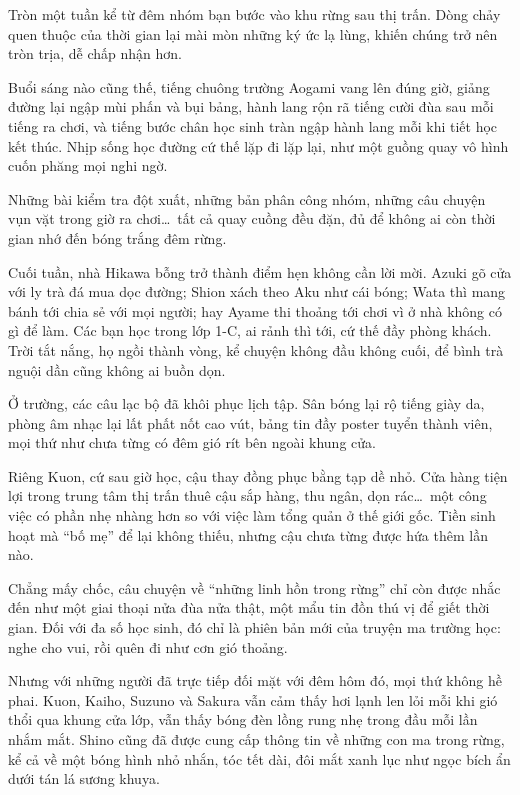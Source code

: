 \documentclass[../main.tex]{subfiles}
\begin{document}
Tròn một tuần kể từ đêm nhóm bạn bước vào khu rừng sau thị trấn. Dòng chảy quen thuộc của thời gian lại mài mòn những ký ức lạ lùng, khiến chúng trở nên tròn trịa, dễ chấp nhận hơn.

Buổi sáng nào cũng thế, tiếng chuông trường Aogami vang lên đúng giờ, giảng đường lại ngập mùi phấn và bụi bảng, hành lang rộn rã tiếng cười đùa sau mỗi tiếng ra chơi, và tiếng bước chân học sinh tràn ngập hành lang mỗi khi tiết học kết thúc. Nhịp sống học đường cứ thế lặp đi lặp lại, như một guồng quay vô hình cuốn phăng mọi nghi ngờ.

Những bài kiểm tra đột xuất, những bản phân công nhóm, những câu chuyện vụn vặt trong giờ ra chơi\dots\ tất cả quay cuồng đều đặn, đủ để không ai còn thời gian nhớ đến bóng trắng đêm rừng.

Cuối tuần, nhà Hikawa bỗng trở thành điểm hẹn không cần lời mời. Azuki gõ cửa với ly trà đá mua dọc đường; Shion xách theo Aku như cái bóng; Wata thì mang bánh tới chia sẻ với mọi người; hay Ayame thi thoảng tới chơi vì ở nhà không có gì để làm. Các bạn học trong lớp 1-C, ai rảnh thì tới, cứ thế đầy phòng khách. Trời tắt nắng, họ ngồi thành vòng, kể chuyện không đầu không cuối, để bình trà nguội dần cũng không ai buồn dọn.

Ở trường, các câu lạc bộ đã khôi phục lịch tập. Sân bóng lại rộ tiếng giày da, phòng âm nhạc lại lất phất nốt cao vút, bảng tin đầy poster tuyển thành viên, mọi thứ như chưa từng có đêm gió rít bên ngoài khung cửa.

Riêng Kuon, cứ sau giờ học, cậu thay đồng phục bằng tạp dề nhỏ. Cửa hàng tiện lợi trong trung tâm thị trấn thuê cậu sắp hàng, thu ngân, dọn rác\dots\ một công việc có phần nhẹ nhàng hơn so với việc làm tổng quản ở thế giới gốc. Tiền sinh hoạt mà ``bố mẹ'' để lại không thiếu, nhưng cậu chưa từng được hứa thêm lần nào.

Chẳng mấy chốc, câu chuyện về ``những linh hồn trong rừng'' chỉ còn được nhắc đến như một giai thoại nửa đùa nửa thật, một mẩu tin đồn thú vị để giết thời gian. Đối với đa số học sinh, đó chỉ là phiên bản mới của truyện ma trường học: nghe cho vui, rồi quên đi như cơn gió thoảng.

Nhưng với những người đã trực tiếp đối mặt với đêm hôm đó, mọi thứ không hề phai. Kuon, Kaiho, Suzuno và Sakura vẫn cảm thấy hơi lạnh len lỏi mỗi khi gió thổi qua khung cửa lớp, vẫn thấy bóng đèn lồng rung nhẹ trong đầu mỗi lần nhắm mắt. Shino cũng đã được cung cấp thông tin về những con ma trong rừng, kể cả về một bóng hình nhỏ nhắn, tóc tết dài, đôi mắt xanh lục như ngọc bích ẩn dưới tán lá sương khuya.
\end{document}
